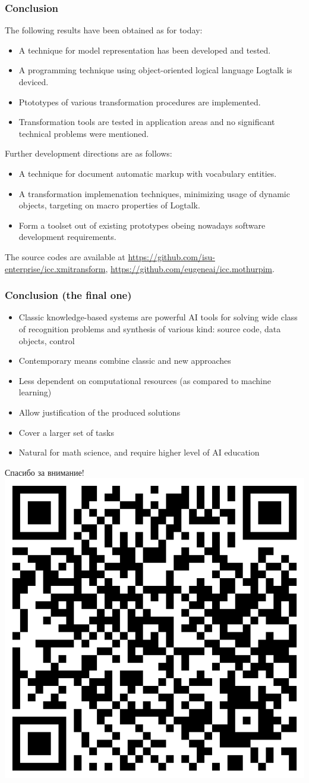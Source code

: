 \documentclass[10pt]{beamer}
\begin{document}
\begin{frame}
  \frametitle{Conclusion}
  The following results have been obtained as for today:
  \begin{itemize}
  \item A technique for model representation has been developed and tested.
  \item A programming technique using object-oriented logical language Logtalk is deviced.
  \item Ptototypes of various transformation procedures are implemented.
  \item Transformation tools are tested in application areas and no significant technical problems were mentioned.
  \end{itemize}
  Further development directions are as follows:
  \begin{itemize}
  \item A technique for document automatic markup with vocabulary entities.
  \item A transformation implemenation techniques, minimizing usage of dynamic objects, targeting on macro properties of Logtalk.
  \item Form a toolset out of existing prototypes obeing nowadays software development requirements.
  \end{itemize}
  The source codes are available at \url{https://github.com/isu-enterprise/icc.xmitransform}, \url{https://github.com/eugeneai/icc.mothurpim}.
\end{frame}
 \begin{frame}
   \frametitle{Conclusion (the final one)}
   \begin{itemize}
   \item Classic knowledge-based systems are powerful AI tools for solving wide class of recognition problems and synthesis of various kind: source code, data objects, control
   \item Contemporary means combine classic and new approaches
   \item Less dependent on computational resources (as compared to machine learning)
   \item Allow justification of the produced solutions
   \item Cover a larger set of tasks
   \item Natural for math science, and require higher level of AI education
   \end{itemize}
 \end{frame}


\begin{frame}
  \begin{center}
    \Large Спасибо за внимание!
\vfill
\includegraphics[width=0.4\linewidth]{presentation.png}
\end{center}
\end{frame}
\end{document}
